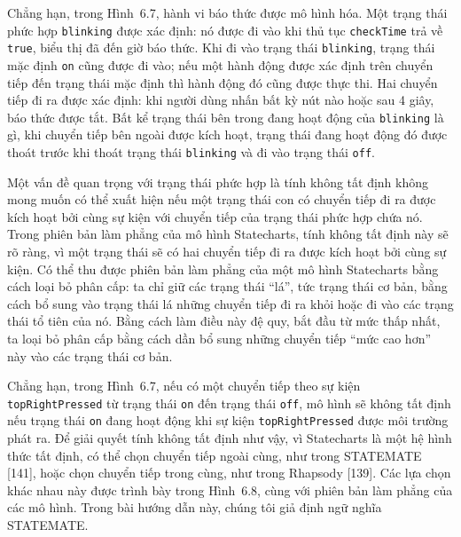 Chẳng hạn, trong Hình~6.7, hành vi báo thức được mô hình hóa. Một trạng thái phức hợp \texttt{blinking} được xác định: nó được đi vào khi thủ tục \texttt{checkTime} trả về \texttt{true}, biểu thị đã đến giờ báo thức. Khi đi vào trạng thái \texttt{blinking}, trạng thái mặc định \texttt{on} cũng được đi vào; nếu một hành động được xác định trên chuyển tiếp đến trạng thái mặc định thì hành động đó cũng được thực thi. Hai chuyển tiếp đi ra được xác định: khi người dùng nhấn bất kỳ nút nào hoặc sau 4 giây, báo thức được tắt. Bất kể trạng thái bên trong đang hoạt động của \texttt{blinking} là gì, khi chuyển tiếp bên ngoài được kích hoạt, trạng thái đang hoạt động đó được thoát trước khi thoát trạng thái \texttt{blinking} và đi vào trạng thái \texttt{off}.

Một vấn đề quan trọng với trạng thái phức hợp là tính không tất định không mong muốn có thể xuất hiện nếu một trạng thái con có chuyển tiếp đi ra được kích hoạt bởi cùng sự kiện với chuyển tiếp của trạng thái phức hợp chứa nó. Trong phiên bản làm phẳng của mô hình Statecharts, tính không tất định này sẽ rõ ràng, vì một trạng thái sẽ có hai chuyển tiếp đi ra được kích hoạt bởi cùng sự kiện. Có thể thu được phiên bản làm phẳng của một mô hình Statecharts bằng cách loại bỏ phân cấp: ta chỉ giữ các trạng thái ``lá'', tức trạng thái cơ bản, bằng cách bổ sung vào trạng thái lá những chuyển tiếp đi ra khỏi hoặc đi vào các trạng thái tổ tiên của nó. Bằng cách làm điều này đệ quy, bắt đầu từ mức thấp nhất, ta loại bỏ phân cấp bằng cách dần bổ sung những chuyển tiếp ``mức cao hơn'' này vào các trạng thái cơ bản.

Chẳng hạn, trong Hình~6.7, nếu có một chuyển tiếp theo sự kiện \texttt{topRightPressed} từ trạng thái \texttt{on} đến trạng thái \texttt{off}, mô hình sẽ không tất định nếu trạng thái \texttt{on} đang hoạt động khi sự kiện \texttt{topRightPressed} được môi trường phát ra. Để giải quyết tính không tất định như vậy, vì Statecharts là một hệ hình thức tất định, có thể chọn chuyển tiếp ngoài cùng, như trong STATEMATE [141], hoặc chọn chuyển tiếp trong cùng,
như trong Rhapsody [139]. Các lựa chọn khác nhau này được trình bày trong Hình~6.8, cùng với phiên bản làm phẳng của các mô hình. Trong bài hướng dẫn này, chúng tôi giả định ngữ nghĩa STATEMATE.



